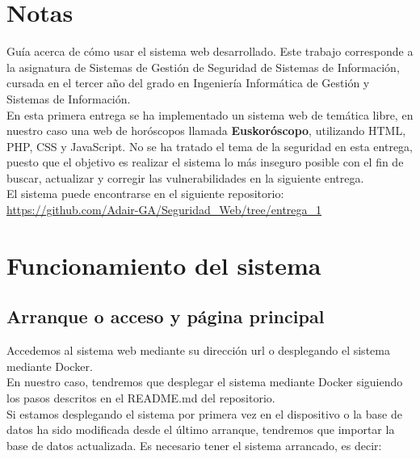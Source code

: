 \documentclass[12pt, twoside]{report}
\begin{document}
    

\thispagestyle{empty} %

\clearpage\setcounter{page}{-1} %

\chapter*{Notas}
%
\noindent Guía acerca de cómo usar el sistema web desarrollado. Este trabajo corresponde a la asignatura de Sistemas de Gestión de Seguridad de Sistemas de Información, cursada en el tercer año del grado en Ingeniería Informática de Gestión y Sistemas de Información.\\
\newline
En esta primera entrega se ha implementado un sistema web de temática libre, en nuestro caso una web de horóscopos llamada \textbf{Euskoróscopo}, utilizando HTML, PHP, CSS y JavaScript. No se ha tratado el tema de la seguridad en esta entrega, puesto que el objetivo es realizar el sistema lo más inseguro posible con el fin de buscar, actualizar y corregir las vulnerabilidades en la siguiente entrega.\\
\newline
El sistema puede encontrarse en el siguiente repositorio:\\
\href{https://github.com/Adair-GA/Seguridad_Web/tree/entrega_1}{https://github.com/Adair-GA/Seguridad\_Web/tree/entrega\_1}
\newline

\chapter{Funcionamiento del sistema}
\section{Arranque o acceso y página principal}
Accedemos al sistema web mediante su dirección url o desplegando el sistema mediante Docker.\\ En nuestro caso, tendremos que desplegar el sistema mediante Docker siguiendo los pasos descritos en el README.md del repositorio.\\
\newline
Si estamos desplegando el sistema por primera vez en el dispositivo o la base de datos ha sido modificada desde el último arranque, tendremos que importar la base de datos actualizada. Es necesario tener el sistema arrancado, es decir:\\
\end{document}
